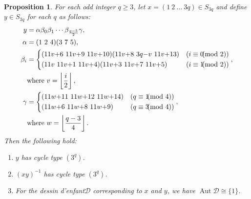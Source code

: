 \documentclass[12pt,reqno]{amsart}
\newcommand{\msD}{\mathscr{D}}
\newcommand{\A}{\alpha}									%
\newcommand{\B}{\beta}									%
\newcommand{\G}{\gamma}								%
\newcommand{\f}[2]{\frac{#1}{#2}}							%
\newcommand{\npmod}[1]{\!\!\!\! \pmod{#1}}					%
\newcommand{\fl}[1]{\left\lfloor #1 \right\rfloor}					%
\DeclareMathOperator{\Aut}{Aut}							%
\theoremstyle{mythmstyle}
\newtheorem{prop}[lemma]{Proposition}
\theoremstyle{mydefstyle}
\newcommand{\dde}{dessin d'enfant\xspace}
\newcommand{\AD}{\Aut{\msD}}
\numberwithin{equation}{section}
\begin{document}
\begin{prop}
\label{prop:c3b3}
For each odd integer $q \ge 3$, let $x = (1\ 2\ \ldots\ 3q) \in S_{3q}$ and define $y \in S_{3q}$ for each $q$ as follows:
\begin{align}
y &= \A \B_{0}\B_{1}\cdots\B_{\f{q-5}{2}} \G, \\
\A &= (1\ 2\ 4)(3\ 7\ 5), \\
\B_{i} &=
\begin{dcases}
(11v{+}6\ 11v{+}9\ 11v{+}10)(11v{+}8\ 3q{-}v\ 11v{+}13) & (i \equiv 0 \npmod{2}) \\
(11v\ 11v{+}1\ 11v{+}4)(11v{+}3\ 11v{+}7\ 11v{+}5) & (i \equiv 1 \npmod{2})
\end{dcases}, \\
&\text{where}\ v = \fl{\f{i}{2}}, \\
\G &=
\begin{dcases}
(11w{+}11\ 11w{+}12\ 11w{+}14) & (q \equiv 1 \npmod{4}) \\
(11w{+}6\ 11w{+}8\ 11w{+}9) & (q \equiv 3 \npmod{4})
\end{dcases}, \\
\label{eq:yqdef}
&\text{where}\ w = \fl{\f{q-3}{4}}.
\end{align}
Then the following hold:
\begin{enumerate}
\item\label{itm:c3b3-1} $y$ has cycle type $(3^{q})$.
\item\label{itm:c3b3-2} $(xy)^{-1}$ has cycle type $(3^{q})$.
\item\label{itm:c3b3-3} For the \dde $\msD$ corresponding to $x$ and $y$, we have $\AD \cong \{ 1 \}$.
\end{enumerate}
\end{prop}
\end{document}
